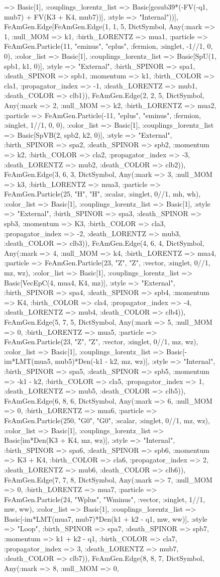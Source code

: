 \documentclass{revtex4}
\begin{document}
\begin{figure}[!htb]
\begin{center}
{=> Basic[1], :couplings_lorentz_list => Basic[gcsub39*(-FV(-q1, mub7) + FV(K3 + K4, mub7))], :style => "Internal"))], FeAmGen.Edge[FeAmGen.Edge(1, 1, 5, Dict{Symbol, Any}(:mark => 1, :null_MOM => k1, :birth_LORENTZ => mua1, :particle => FeAmGen.Particle(11, "eminus", "eplus", :fermion, :singlet, -1//1, 0, 0), :color_list => Basic[1], :couplings_lorentz_list => Basic[SpU(1, spb1, k1, 0)], :style => "External", :birth_SPINOR => spa1, :death_SPINOR => spb1, :momentum => k1, :birth_COLOR => cla1, :propagator_index => -1, :death_LORENTZ => mub1, :death_COLOR => clb1)), FeAmGen.Edge(2, 2, 5, Dict{Symbol, Any}(:mark => 2, :null_MOM => k2, :birth_LORENTZ => mua2, :particle => FeAmGen.Particle(-11, "eplus", "eminus", :fermion, :singlet, 1//1, 0, 0), :color_list => Basic[1], :couplings_lorentz_list => Basic[SpVB(2, spb2, k2, 0)], :style => "External", :birth_SPINOR => spa2, :death_SPINOR => spb2, :momentum => k2, :birth_COLOR => cla2, :propagator_index => -3, :death_LORENTZ => mub2, :death_COLOR => clb2)), FeAmGen.Edge(3, 6, 3, Dict{Symbol, Any}(:mark => 3, :null_MOM => k3, :birth_LORENTZ => mua3, :particle => FeAmGen.Particle(25, "H", "H", :scalar, :singlet, 0//1, mh, wh), :color_list => Basic[1], :couplings_lorentz_list => Basic[1], :style => "External", :birth_SPINOR => spa3, :death_SPINOR => spb3, :momentum => K3, :birth_COLOR => cla3, :propagator_index => -2, :death_LORENTZ => mub3, :death_COLOR => clb3)), FeAmGen.Edge(4, 6, 4, Dict{Symbol, Any}(:mark => 4, :null_MOM => k4, :birth_LORENTZ => mua4, :particle => FeAmGen.Particle(23, "Z", "Z", :vector, :singlet, 0//1, mz, wz), :color_list => Basic[1], :couplings_lorentz_list => Basic[VecEpC(4, mua4, K4, mz)], :style => "External", :birth_SPINOR => spa4, :death_SPINOR => spb4, :momentum => K4, :birth_COLOR => cla4, :propagator_index => -4, :death_LORENTZ => mub4, :death_COLOR => clb4)), FeAmGen.Edge(5, 7, 5, Dict{Symbol, Any}(:mark => 5, :null_MOM => 0, :birth_LORENTZ => mua5, :particle => FeAmGen.Particle(23, "Z", "Z", :vector, :singlet, 0//1, mz, wz), :color_list => Basic[1], :couplings_lorentz_list => Basic[-im*LMT(mua5, mub5)*Den(-k1 - k2, mz, wz)], :style => "Internal", :birth_SPINOR => spa5, :death_SPINOR => spb5, :momentum => -k1 - k2, :birth_COLOR => cla5, :propagator_index => 1, :death_LORENTZ => mub5, :death_COLOR => clb5)), FeAmGen.Edge(6, 8, 6, Dict{Symbol, Any}(:mark => 6, :null_MOM => 0, :birth_LORENTZ => mua6, :particle => FeAmGen.Particle(250, "G0", "G0", :scalar, :singlet, 0//1, mz, wz), :color_list => Basic[1], :couplings_lorentz_list => Basic[im*Den(K3 + K4, mz, wz)], :style => "Internal", :birth_SPINOR => spa6, :death_SPINOR => spb6, :momentum => K3 + K4, :birth_COLOR => cla6, :propagator_index => 2, :death_LORENTZ => mub6, :death_COLOR => clb6)), FeAmGen.Edge(7, 7, 8, Dict{Symbol, Any}(:mark => 7, :null_MOM => 0, :birth_LORENTZ => mua7, :particle => FeAmGen.Particle(24, "Wplus", "Wminus", :vector, :singlet, 1//1, mw, ww), :color_list => Basic[1], :couplings_lorentz_list => Basic[-im*LMT(mua7, mub7)*Den(k1 + k2 - q1, mw, ww)], :style => "Loop", :birth_SPINOR => spa7, :death_SPINOR => spb7, :momentum => k1 + k2 - q1, :birth_COLOR => cla7, :propagator_index => 3, :death_LORENTZ => mub7, :death_COLOR => clb7)), FeAmGen.Edge(8, 8, 7, Dict{Symbol, Any}(:mark => 8, :null_MOM => 0, }
\end{center}
\end{figure}
\end{document}
